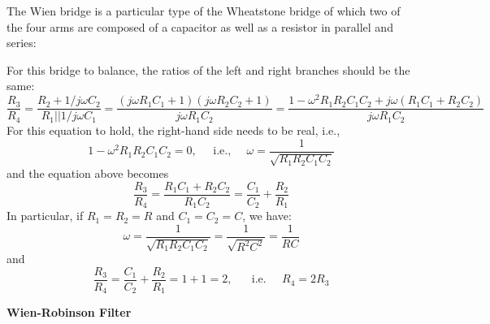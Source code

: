 \documentclass{article}
\begin{document}
The Wien bridge is a particular type of the Wheatstone bridge of which
two of the four arms are composed of a capacitor as well as a resistor
in parallel and series:


For this bridge to balance, the ratios of the left and right branches
should be the same:
\begin{equation}
\frac{R_3}{R_4}=\frac{R_2+1/j\omega C_2}{R_1||1/j\omega C_1}
=\frac{(j\omega R_1C_1+1)(j\omega R_2C_2+1)}{j\omega R_1C_2}
=\frac{1-\omega^2R_1R_2C_1C_2+j\omega(R_1C_1+R_2C_2)}{j\omega R_1C_2}
\end{equation}
For this equation to hold, the right-hand side needs to be real, i.e.,
\begin{equation}
1-\omega^2R_1R_2C_1C_2=0,\;\;\;\;\;\mbox{i.e.,}\;\;\;\;\;
\omega=\frac{1}{\sqrt{R_1R_2C_1C_2}}
\end{equation}
and the equation above becomes
\begin{equation}
\frac{R_3}{R_4}=\frac{R_1C_1+R_2C_2}{R_1C_2}=\frac{C_1}{C_2}+\frac{R_2}{R_1}
\end{equation}
In particular, if $R_1=R_2=R$ and $C_1=C_2=C$, we have:
\begin{equation}
\omega=\frac{1}{\sqrt{R_1R_2C_1C_2}}
=\frac{1}{\sqrt{R^2C^2}}=\frac{1}{RC}
\end{equation}
and
\begin{equation}
\frac{R_3}{R_4}=\frac{C_1}{C_2}+\frac{R_2}{R_1}=1+1=2,
\;\;\;\;\;\;\mbox{i.e.}\;\;\;\;\;R_4=2R_3
\end{equation}


{\bf Wien-Robinson Filter}

\end{document}
